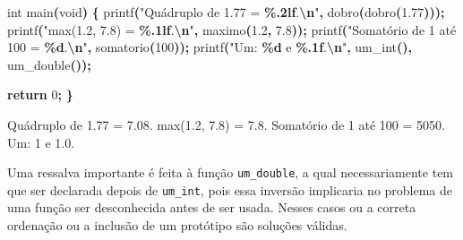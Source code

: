 \documentclass[
  11pt,
  a4paper,
]{scrbook}
\newenvironment{Shaded}{\begin{snugshade}}{\end{snugshade}}
\newcommand{\ControlFlowTok}[1]{\textcolor[rgb]{0.13,0.29,0.53}{\textbf{#1}}}
\newcommand{\DataTypeTok}[1]{\textcolor[rgb]{0.13,0.29,0.53}{#1}}
\newcommand{\DecValTok}[1]{\textcolor[rgb]{0.00,0.00,0.81}{#1}}
\newcommand{\FloatTok}[1]{\textcolor[rgb]{0.00,0.00,0.81}{#1}}
\newcommand{\NormalTok}[1]{#1}
\newcommand{\OperatorTok}[1]{\textcolor[rgb]{0.81,0.36,0.00}{\textbf{#1}}}
\newcommand{\SpecialCharTok}[1]{\textcolor[rgb]{0.81,0.36,0.00}{\textbf{#1}}}
\newcommand{\StringTok}[1]{\textcolor[rgb]{0.31,0.60,0.02}{#1}}
\begin{document}
\begin{Shaded}
\begin{Highlighting}[numbers=left,,]
\DataTypeTok{int}\NormalTok{ main}\OperatorTok{(}\DataTypeTok{void}\OperatorTok{)} \OperatorTok{\{}
\NormalTok{    printf}\OperatorTok{(}\StringTok{"Quádruplo de 1.77 = }\SpecialCharTok{\%.2lf}\StringTok{.}\SpecialCharTok{\textbackslash{}n}\StringTok{"}\OperatorTok{,}\NormalTok{ dobro}\OperatorTok{(}\NormalTok{dobro}\OperatorTok{(}\FloatTok{1.77}\OperatorTok{)));}
\NormalTok{    printf}\OperatorTok{(}\StringTok{"max(1.2, 7.8) = }\SpecialCharTok{\%.1lf}\StringTok{.}\SpecialCharTok{\textbackslash{}n}\StringTok{"}\OperatorTok{,}\NormalTok{ maximo}\OperatorTok{(}\FloatTok{1.2}\OperatorTok{,} \FloatTok{7.8}\OperatorTok{));}
\NormalTok{    printf}\OperatorTok{(}\StringTok{"Somatório de 1 até 100 = }\SpecialCharTok{\%d}\StringTok{.}\SpecialCharTok{\textbackslash{}n}\StringTok{"}\OperatorTok{,}\NormalTok{ somatorio}\OperatorTok{(}\DecValTok{100}\OperatorTok{));}
\NormalTok{    printf}\OperatorTok{(}\StringTok{"Um: }\SpecialCharTok{\%d}\StringTok{ e }\SpecialCharTok{\%.1f}\StringTok{.}\SpecialCharTok{\textbackslash{}n}\StringTok{"}\OperatorTok{,}\NormalTok{ um\_int}\OperatorTok{(),}\NormalTok{ um\_double}\OperatorTok{());}

    \ControlFlowTok{return} \DecValTok{0}\OperatorTok{;}
\OperatorTok{\}}
\end{Highlighting}
\end{Shaded}

\begin{Shaded}
\begin{Highlighting}[]
\NormalTok{Quádruplo de 1.77 = 7.08.}
\NormalTok{max(1.2, 7.8) = 7.8.}
\NormalTok{Somatório de 1 até 100 = 5050.}
\NormalTok{Um: 1 e 1.0.}
\end{Highlighting}
\end{Shaded}

Uma ressalva importante é feita à função \texttt{um\_double}, a qual
necessariamente tem que ser declarada depois de \texttt{um\_int}, pois
essa inversão implicaria no problema de uma função ser desconhecida
antes de ser usada. Nesses casos ou a correta ordenação ou a inclusão de
um protótipo são soluções válidas.
\end{document}
